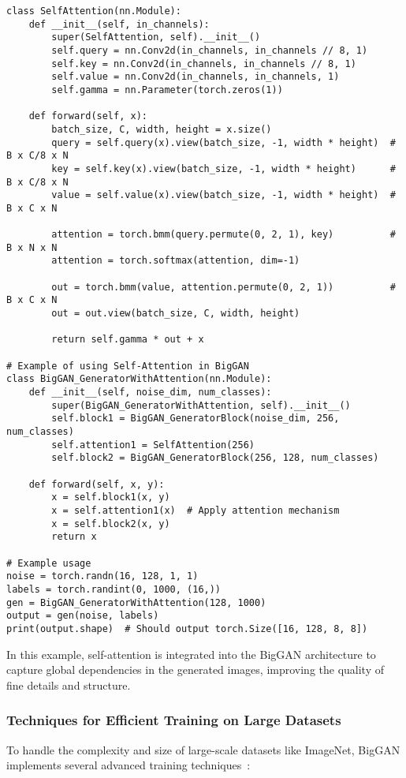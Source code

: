\begin{lstlisting}[style=python]
class SelfAttention(nn.Module):
    def __init__(self, in_channels):
        super(SelfAttention, self).__init__()
        self.query = nn.Conv2d(in_channels, in_channels // 8, 1)
        self.key = nn.Conv2d(in_channels, in_channels // 8, 1)
        self.value = nn.Conv2d(in_channels, in_channels, 1)
        self.gamma = nn.Parameter(torch.zeros(1))
    
    def forward(self, x):
        batch_size, C, width, height = x.size()
        query = self.query(x).view(batch_size, -1, width * height)  # B x C/8 x N
        key = self.key(x).view(batch_size, -1, width * height)      # B x C/8 x N
        value = self.value(x).view(batch_size, -1, width * height)  # B x C x N
        
        attention = torch.bmm(query.permute(0, 2, 1), key)          # B x N x N
        attention = torch.softmax(attention, dim=-1)
        
        out = torch.bmm(value, attention.permute(0, 2, 1))          # B x C x N
        out = out.view(batch_size, C, width, height)
        
        return self.gamma * out + x

# Example of using Self-Attention in BigGAN
class BigGAN_GeneratorWithAttention(nn.Module):
    def __init__(self, noise_dim, num_classes):
        super(BigGAN_GeneratorWithAttention, self).__init__()
        self.block1 = BigGAN_GeneratorBlock(noise_dim, 256, num_classes)
        self.attention1 = SelfAttention(256)
        self.block2 = BigGAN_GeneratorBlock(256, 128, num_classes)
    
    def forward(self, x, y):
        x = self.block1(x, y)
        x = self.attention1(x)  # Apply attention mechanism
        x = self.block2(x, y)
        return x

# Example usage
noise = torch.randn(16, 128, 1, 1)
labels = torch.randint(0, 1000, (16,))
gen = BigGAN_GeneratorWithAttention(128, 1000)
output = gen(noise, labels)
print(output.shape)  # Should output torch.Size([16, 128, 8, 8])
\end{lstlisting}

In this example, self-attention is integrated into the BigGAN architecture to capture global dependencies in the generated images, improving the quality of fine details and structure.

\subsubsection{Techniques for Efficient Training on Large Datasets}
To handle the complexity and size of large-scale datasets like ImageNet, BigGAN implements several advanced training techniques~\cite{adadi2021survey}:

